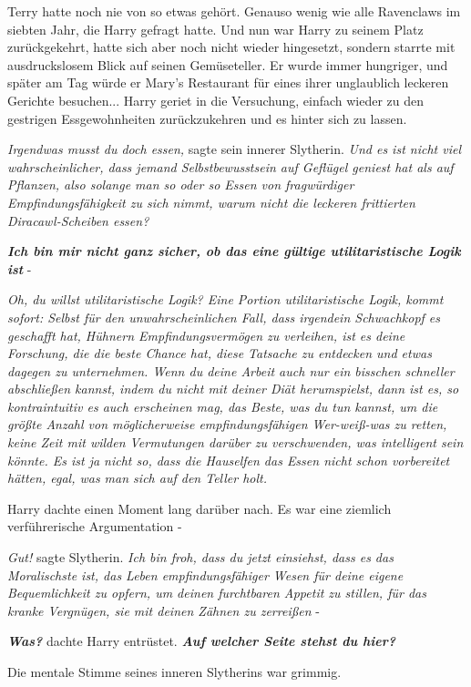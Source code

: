 Terry hatte noch nie von so etwas gehört. Genauso wenig wie alle Ravenclaws im
siebten Jahr, die Harry gefragt hatte. Und nun war Harry zu seinem Platz
zurückgekehrt, hatte sich aber noch nicht wieder hingesetzt, sondern starrte mit
ausdruckslosem Blick auf seinen Gemüseteller. Er wurde immer hungriger, und
später am Tag würde er Mary's Restaurant für eines ihrer unglaublich leckeren
Gerichte besuchen... Harry geriet in die Versuchung, einfach wieder zu den
gestrigen Essgewohnheiten zurückzukehren und es hinter sich zu lassen.

\emph{Irgendwas musst du doch essen,} sagte sein innerer Slytherin.
\emph{Und es ist nicht viel wahrscheinlicher, dass jemand Selbstbewusstsein auf
Geflügel geniest hat als auf Pflanzen, also solange man so oder so Essen von
fragwürdiger Empfindungsfähigkeit zu sich nimmt, warum nicht die leckeren
frittierten Diracawl-Scheiben essen?}

\textbf{\emph{Ich bin mir nicht ganz sicher, ob das eine gültige
utilitaristische Logik ist}} -

\emph{Oh, du willst utilitaristische Logik? Eine Portion utilitaristische
Logik, kommt sofort: Selbst für den unwahrscheinlichen Fall, dass irgendein
Schwachkopf es geschafft hat, Hühnern Empfindungsvermögen zu verleihen, ist es
deine Forschung, die die beste Chance hat, diese Tatsache zu entdecken und
etwas dagegen zu unternehmen. Wenn du deine Arbeit auch nur ein bisschen
schneller abschließen kannst, indem du nicht mit deiner Diät herumspielst, dann
ist es, so kontraintuitiv es auch erscheinen mag, das Beste, was du tun kannst,
um die größte Anzahl von möglicherweise empfindungsfähigen Wer-weiß-was zu
retten, keine Zeit mit wilden Vermutungen darüber zu verschwenden, was
intelligent sein könnte. Es ist ja nicht so, dass die Hauselfen das Essen nicht
schon vorbereitet hätten, egal, was man sich auf den Teller holt.}

Harry dachte einen Moment lang darüber nach. Es war eine ziemlich verführerische
Argumentation -

\emph{Gut!} sagte Slytherin. \emph{Ich bin froh, dass du jetzt einsiehst, dass
es das Moralischste ist, das Leben empfindungsfähiger Wesen für deine eigene
Bequemlichkeit zu opfern, um deinen furchtbaren Appetit zu stillen, für das
kranke Vergnügen, sie mit deinen Zähnen zu zerreißen} -

\textbf{\emph{Was?}} dachte Harry entrüstet. \textbf{\emph{Auf welcher Seite
stehst du hier?}}

Die mentale Stimme seines inneren Slytherins war grimmig.

